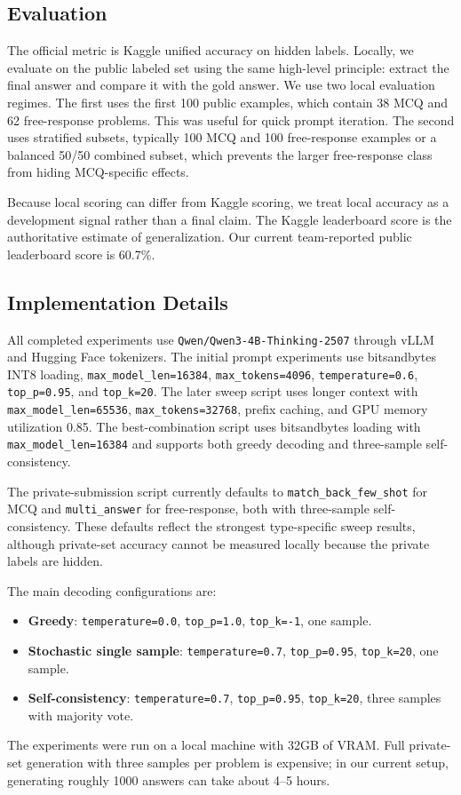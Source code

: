 \documentclass{article}
\newcommand{\modelhf}{\texttt{Qwen/Qwen3-4B-Thinking-2507}}
\begin{document}
\subsection{Evaluation}
\label{sec:evaluation}

The official metric is Kaggle unified accuracy on hidden labels. Locally, we evaluate on the public labeled set using the same high-level principle: extract the final answer and compare it with the gold answer. We use two local evaluation regimes. The first uses the first 100 public examples, which contain 38 MCQ and 62 free-response problems. This was useful for quick prompt iteration. The second uses stratified subsets, typically 100 MCQ and 100 free-response examples or a balanced 50/50 combined subset, which prevents the larger free-response class from hiding MCQ-specific effects.

Because local scoring can differ from Kaggle scoring, we treat local accuracy as a development signal rather than a final claim. The Kaggle leaderboard score is the authoritative estimate of generalization. Our current team-reported public leaderboard score is 60.7\%.

\subsection{Implementation Details}
\label{sec:implementation_details}

All completed experiments use \modelhf{} through vLLM and Hugging Face tokenizers. The initial prompt experiments use bitsandbytes INT8 loading, \texttt{max\_model\_len=16384}, \texttt{max\_tokens=4096}, \texttt{temperature=0.6}, \texttt{top\_p=0.95}, and \texttt{top\_k=20}. The later sweep script uses longer context with \texttt{max\_model\_len=65536}, \texttt{max\_tokens=32768}, prefix caching, and GPU memory utilization 0.85. The best-combination script uses bitsandbytes loading with \texttt{max\_model\_len=16384} and supports both greedy decoding and three-sample self-consistency.

The private-submission script currently defaults to \texttt{match\_back\_few\_shot} for MCQ and \texttt{multi\_answer} for free-response, both with three-sample self-consistency. These defaults reflect the strongest type-specific sweep results, although private-set accuracy cannot be measured locally because the private labels are hidden.

The main decoding configurations are:
\begin{itemize}
  \item \textbf{Greedy}: \texttt{temperature=0.0}, \texttt{top\_p=1.0}, \texttt{top\_k=-1}, one sample.
  \item \textbf{Stochastic single sample}: \texttt{temperature=0.7}, \texttt{top\_p=0.95}, \texttt{top\_k=20}, one sample.
  \item \textbf{Self-consistency}: \texttt{temperature=0.7}, \texttt{top\_p=0.95}, \texttt{top\_k=20}, three samples with majority vote.
\end{itemize}
The experiments were run on a local machine with 32GB of VRAM. Full private-set generation with three samples per problem is expensive; in our current setup, generating roughly 1000 answers can take about 4--5 hours.
\end{document}
